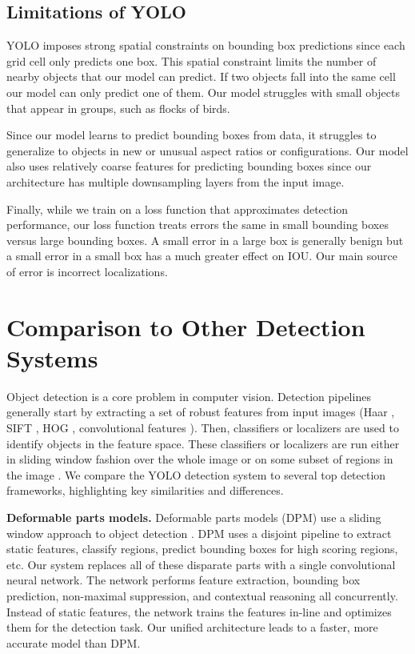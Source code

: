 \documentclass{article} %
\begin{document}
\subsection{Limitations of YOLO}

YOLO imposes strong spatial constraints on bounding box predictions since each grid cell only predicts one box. This spatial constraint limits the number of nearby objects that our model can predict. If two objects fall into the same cell our model can only predict one of them. Our model struggles with small objects that appear in groups, such as flocks of birds.

Since our model learns to predict bounding boxes from data, it struggles to generalize to objects in new or unusual aspect ratios or configurations. Our model also uses relatively coarse features for predicting bounding boxes since our architecture has multiple downsampling layers from the input image.

Finally, while we train on a loss function that approximates detection performance, our loss function treats errors the same in small bounding boxes versus large bounding boxes. A small error in a large box is generally benign but a small error in a small box has a much greater effect on IOU. Our main source of error is incorrect localizations.


\section{Comparison to Other Detection Systems}

Object detection is a core problem in computer vision. Detection pipelines generally start by extracting a set of robust features from input images (Haar \cite{papageorgiou1998general}, SIFT \cite{lowe1999object}, HOG \cite{dalal2005histograms}, convolutional features \cite{donahue2013decaf}). Then, classifiers \cite{viola2001robust,lienhart2002extended,girshick2014rich,lsvm-pami} or localizers \cite{blaschko2008learning,DBLP:journals/corr/SermanetEZMFL13} are used to identify objects in the feature space. These classifiers or localizers are run either in sliding window fashion over the whole image or on some subset of regions in the image \cite{uijlings2013selective,gould2009region,zitnick2014edge}. We compare the YOLO detection system to several top detection frameworks, highlighting key similarities and differences.

\textbf{Deformable parts models.} Deformable parts models (DPM) use a sliding window approach to object detection \cite{lsvm-pami}. DPM uses a disjoint pipeline to extract static features, classify regions, predict bounding boxes for high scoring regions, etc. Our system replaces all of these disparate parts with a single convolutional neural network. The network performs feature extraction, bounding box prediction, non-maximal suppression, and contextual reasoning all concurrently. Instead of static features, the network trains the features in-line and optimizes them for the detection task. Our unified architecture leads to a faster, more accurate model than DPM.
\end{document}
